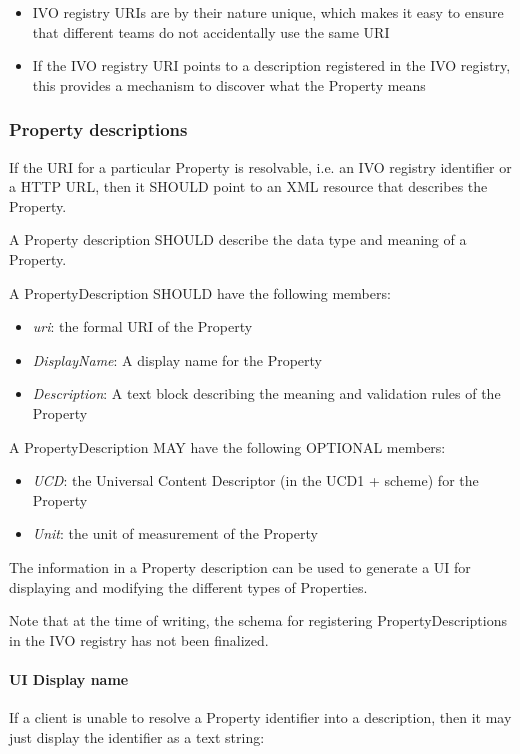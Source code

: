 \documentclass[11pt,a4paper]{ivoa}
\begin{document}
\begin{itemize}
    \item IVO registry URIs are by their nature unique, which makes it easy to ensure that different teams do not accidentally use the same URI
    \item If the IVO registry URI points to a description registered in the IVO registry, this provides a mechanism to discover what the Property means
\end{itemize}

\subsubsection{Property descriptions}
\label{subsubsec:property descriptions}
If the URI for a particular Property is resolvable, i.e. an IVO registry identifier or a HTTP URL, then it SHOULD point to an XML resource that describes the Property.

A Property description SHOULD describe the data type and meaning of a Property.

A PropertyDescription SHOULD have the following members:

\begin{itemize}
    \item \emph{uri}: the formal URI of the Property
    \item \emph{DisplayName}: A display name for the Property
    \item \emph{Description}: A text block describing the meaning and validation rules of the Property
\end{itemize}

A PropertyDescription MAY have the following OPTIONAL members:

\begin{itemize}
    \item \emph{UCD}: the Universal Content Descriptor (in the UCD1 + scheme) for the Property
    \item \emph{Unit}: the unit of measurement of the Property
\end{itemize}

The information in a Property description can be used to generate a UI for displaying and modifying the different types of Properties.

Note that at the time of writing, the schema for registering PropertyDescriptions in the IVO registry has not been finalized.

\paragraph{UI Display name}
If a client is unable to resolve a Property identifier into a description, then it may just display the identifier as a text string:
\end{document}
